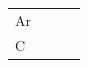 \begin{enumerate}[noitemsep, label=\textbf{\arabic*}. ]
{\begin{tabular}[t]{|l|l|l|l|}
    
     \tabularnewline\cline{1-1}\cline{2-2}\cline{3-3}\cline{4-4}
    
    
        \begin{math}\mathrm{Ar}\end{math} &
    
    
         &
    
    
         &
    
    
     \tabularnewline\cline{1-1}\cline{2-2}\cline{3-3}\cline{4-4}
    
    
        \begin{math}\mathrm{C}\end{math} &
    
    
         &
    
    

\end{tabular}}
\end{enumerate}
